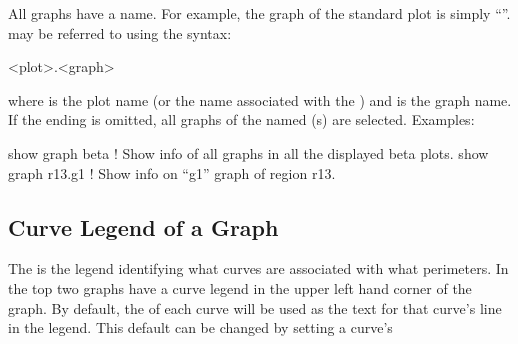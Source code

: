 {{All graphs have a name. For example, the graph of the standard  plot is simply ``''.
 may be referred to using the syntax:
\begin{example}
  <plot>.<graph>
\end{example}
where  is the plot name (or the  name associated with the ) and
 is the graph name. If the  ending is omitted, all graphs of the named
(s) are selected. Examples:
\begin{example}
  show graph beta   ! Show info of all graphs in all the displayed beta plots.
  show graph r13.g1 ! Show info on ``g1'' graph of region r13.
\end{example}

\subsection{Curve Legend of a Graph}
\label{s:curve.legend}

The  is the legend identifying what curves are associated with what perimeters. In
 the top two graphs have a curve legend in the upper left hand corner of the graph.
By default, the  of each curve will be used as the text for that
curve's line in the legend.  This default can be changed by setting a curve's \vn{curve%
Parameters that affect the curve legend are:
\begin{example}
  plot_page%
  plot_page%
  plot_page%
  curve(N)%
  graph%
  graph%
\end{example}
The curve legend is distinct from the \vn{text legend} (\sref{s:text.legend}).

\subsection{Text Legend}
\label{s:text.legend}

The \vn{text legend} is a legend that can be setup by either the user or by \tao itself.
\tao uses the text legend in conjunction with phase space plotting or histogram displays.
The \vn{text legend} is distinct from the \vn{curve legend}. Parameters that affect the text
legend are:
\begin{example}
  graph%
  graph%
\end{example}

}}}
